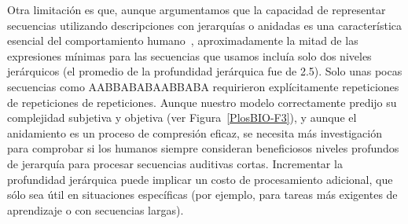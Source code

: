 
Otra limitación es que, aunque argumentamos que la capacidad de representar secuencias utilizando descripciones con jerarquías o anidadas es una característica esencial del comportamiento humano~\cite{f4}, aproximadamente la mitad de las expresiones mínimas para las secuencias que usamos incluía solo dos niveles jerárquicos (el promedio de la profundidad jerárquica fue de 2.5). Solo unas pocas secuencias como AABBABABAABBABA requirieron explícitamente repeticiones de repeticiones de repeticiones. Aunque nuestro modelo correctamente predijo su complejidad subjetiva y objetiva (ver Figura~\ref{PlosBIO-F3}), y aunque el anidamiento es un proceso de compresión eficaz, se necesita más investigación para comprobar si los humanos siempre consideran beneficiosos niveles profundos de jerarquía para procesar secuencias auditivas cortas. Incrementar la profundidad jerárquica puede implicar un costo de procesamiento adicional, que sólo sea útil en situaciones específicas (por ejemplo, para tareas más exigentes de aprendizaje o con secuencias largas).

